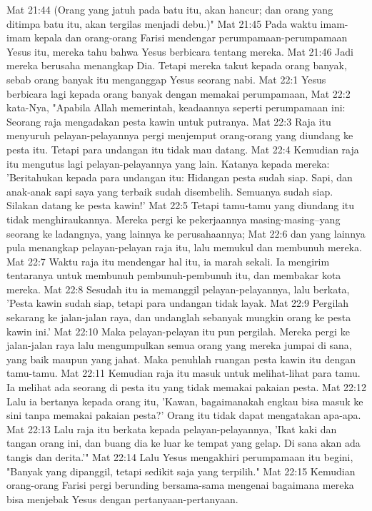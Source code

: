 Mat 21:44  (Orang yang jatuh pada batu itu, akan hancur; dan orang yang ditimpa batu itu, akan tergilas menjadi debu.)"
Mat 21:45  Pada waktu imam-imam kepala dan orang-orang Farisi mendengar perumpamaan-perumpamaan Yesus itu, mereka tahu bahwa Yesus berbicara tentang mereka.
Mat 21:46  Jadi mereka berusaha menangkap Dia. Tetapi mereka takut kepada orang banyak, sebab orang banyak itu menganggap Yesus seorang nabi.
Mat 22:1  Yesus berbicara lagi kepada orang banyak dengan memakai perumpamaan,
Mat 22:2  kata-Nya, "Apabila Allah memerintah, keadaannya seperti perumpamaan ini: Seorang raja mengadakan pesta kawin untuk putranya.
Mat 22:3  Raja itu menyuruh pelayan-pelayannya pergi menjemput orang-orang yang diundang ke pesta itu. Tetapi para undangan itu tidak mau datang.
Mat 22:4  Kemudian raja itu mengutus lagi pelayan-pelayannya yang lain. Katanya kepada mereka: 'Beritahukan kepada para undangan itu: Hidangan pesta sudah siap. Sapi, dan anak-anak sapi saya yang terbaik sudah disembelih. Semuanya sudah siap. Silakan datang ke pesta kawin!'
Mat 22:5  Tetapi tamu-tamu yang diundang itu tidak menghiraukannya. Mereka pergi ke pekerjaannya masing-masing--yang seorang ke ladangnya, yang lainnya ke perusahaannya;
Mat 22:6  dan yang lainnya pula menangkap pelayan-pelayan raja itu, lalu memukul dan membunuh mereka.
Mat 22:7  Waktu raja itu mendengar hal itu, ia marah sekali. Ia mengirim tentaranya untuk membunuh pembunuh-pembunuh itu, dan membakar kota mereka.
Mat 22:8  Sesudah itu ia memanggil pelayan-pelayannya, lalu berkata, 'Pesta kawin sudah siap, tetapi para undangan tidak layak.
Mat 22:9  Pergilah sekarang ke jalan-jalan raya, dan undanglah sebanyak mungkin orang ke pesta kawin ini.'
Mat 22:10  Maka pelayan-pelayan itu pun pergilah. Mereka pergi ke jalan-jalan raya lalu mengumpulkan semua orang yang mereka jumpai di sana, yang baik maupun yang jahat. Maka penuhlah ruangan pesta kawin itu dengan tamu-tamu.
Mat 22:11  Kemudian raja itu masuk untuk melihat-lihat para tamu. Ia melihat ada seorang di pesta itu yang tidak memakai pakaian pesta.
Mat 22:12  Lalu ia bertanya kepada orang itu, 'Kawan, bagaimanakah engkau bisa masuk ke sini tanpa memakai pakaian pesta?' Orang itu tidak dapat mengatakan apa-apa.
Mat 22:13  Lalu raja itu berkata kepada pelayan-pelayannya, 'Ikat kaki dan tangan orang ini, dan buang dia ke luar ke tempat yang gelap. Di sana akan ada tangis dan derita.'"
Mat 22:14  Lalu Yesus mengakhiri perumpamaan itu begini, "Banyak yang dipanggil, tetapi sedikit saja yang terpilih."
Mat 22:15  Kemudian orang-orang Farisi pergi berunding bersama-sama mengenai bagaimana mereka bisa menjebak Yesus dengan pertanyaan-pertanyaan.

